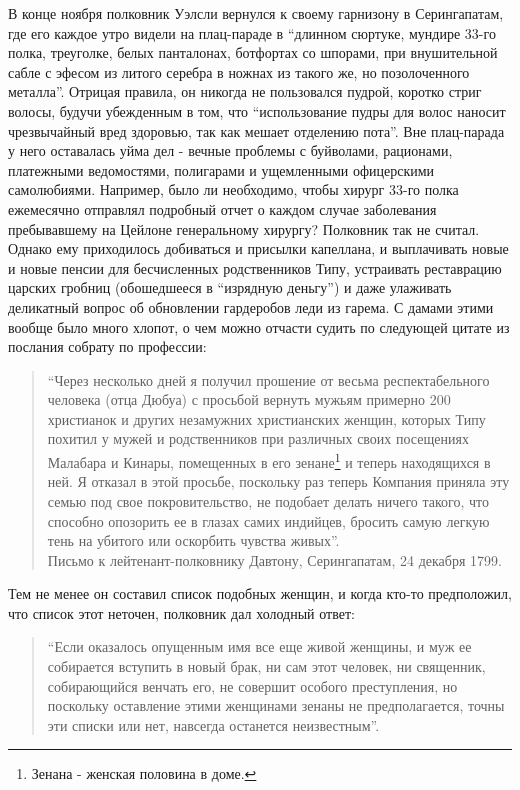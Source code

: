 \documentclass[
  oneside,
  12pt,
  titlepage]{book}
\begin{document}
В конце ноября полковник Уэлсли вернулся к своему гарнизону в Серингапатам, где его каждое утро видели на плац-параде в ``длинном сюртуке, мундире 33-го полка, треуголке, белых панталонах, ботфортах со шпорами, при внушительной сабле с эфесом из литого серебра в ножнах из такого же, но позолоченного металла''. Отрицая правила, он никогда не пользовался пудрой, коротко стриг волосы, будучи убежденным в том, что ``использование пудры для волос наносит чрезвычайный вред здоровью, так как мешает отделению пота''. Вне плац-парада у него оставалась уйма дел - вечные проблемы с буйволами, рационами, платежными ведомостями, полигарами и ущемленными офицерскими самолюбиями. Например, было ли необходимо, чтобы хирург 33-го полка ежемесячно отправлял подробный отчет о каждом случае заболевания пребывавшему на Цейлоне генеральному хирургу? Полковник так не считал. Однако ему приходилось добиваться и присылки капеллана, и выплачивать новые и новые пенсии для бесчисленных родственников Типу, устраивать реставрацию царских гробниц (обошедшееся в ``изрядную деньгу'') и даже улаживать деликатный вопрос об обновлении гардеробов леди из гарема. С дамами этими вообще было много хлопот, о чем можно отчасти судить по следующей цитате из послания собрату по профессии:

\begin{quote}
``Через несколько дней я получил прошение от весьма респектабельного человека (отца Дюбуа) с просьбой вернуть мужьям примерно 200 христианок и других незамужних христианских женщин, которых Типу похитил у мужей и родственников при различных своих посещениях Малабара и Кинары, помещенных в его зенане\footnote{Зенана - женская половина в доме.} и теперь находящихся в ней. Я отказал в этой просьбе, поскольку раз теперь Компания приняла эту семью под свое покровительство, не подобает делать ничего такого, что способно опозорить ее в глазах самих индийцев, бросить самую легкую тень на убитого или оскорбить чувства живых''.\\
Письмо к лейтенант-полковнику Давтону, Серингапатам, 24 декабря 1799.
\end{quote}

Тем не менее он составил список подобных женщин, и когда кто-то предположил, что список этот неточен, полковник дал холодный ответ:

\begin{quote}
``Если оказалось опущенным имя все еще живой женщины, и муж ее собирается вступить в новый брак, ни сам этот человек, ни священник, собирающийся венчать его, не совершит особого преступления, но поскольку оставление этими женщинами зенаны не предполагается, точны эти списки или нет, навсегда останется неизвестным''.
\end{quote}
\end{document}
